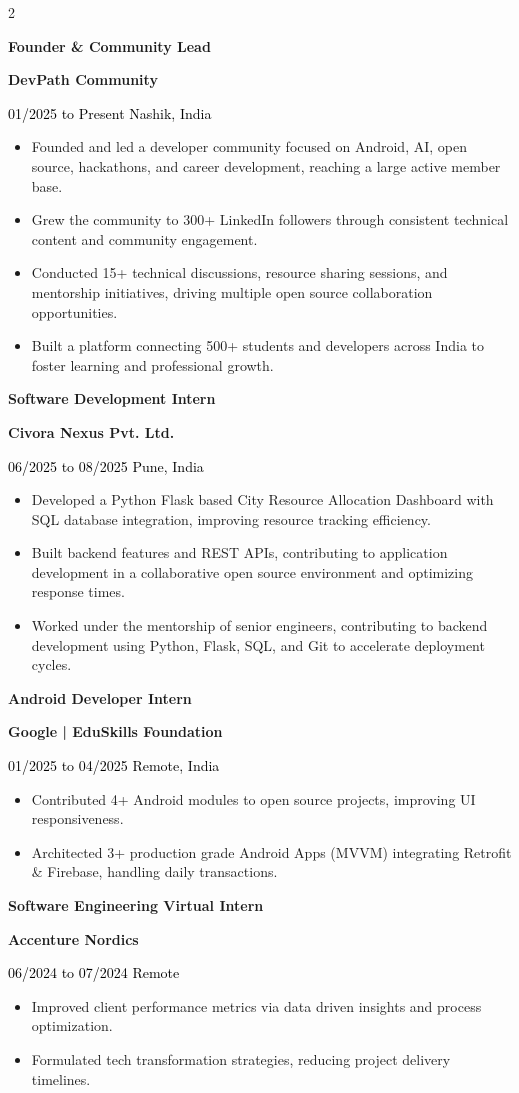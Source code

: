 \documentclass[10pt,a4paper,withhyper]{altacv}
\renewcommand{\cvevent}[4]{%
  \vspace{0.8em}
  {\normalsize\textbf{#1}} \par
  \ifstrequal{#2}{}{}{{\normalsize\rmfamily\textcolor{MyBlue}{\textbf{#2}}} \par}
  \vspace{0.25em}
  \ifstrequal{#3}{}{}{%
    \ifstrequal{#4}{}{%
      {\small\textcolor{Black}{\faCalendar* \hspace{0.2em} #3}}\par
    }{%
      {\small\textcolor{Black}{\faCalendar* \hspace{0.2em} #3 \hspace{1.5em} \faMapMarker \hspace{0.2em} #4}}\par
    }
  }
  \vspace{0.25em}
}
\begin{document}
\begin{paracol}{2}
\switchcolumn

\cvevent{Founder \& Community Lead}{DevPath Community}{01/2025 to Present}{Nashik, India}
\begin{itemize}
  \item Founded and led a developer community focused on Android, AI, open source, hackathons, and career development, reaching a large active member base.
  \item Grew the community to 300+ LinkedIn followers through consistent technical content and community engagement.
  \item Conducted 15+ technical discussions, resource sharing sessions, and mentorship initiatives, driving multiple open source collaboration opportunities.
  \item Built a platform connecting 500+ students and developers across India to foster learning and professional growth.
\end{itemize}

\cvevent{Software Development Intern}{Civora Nexus Pvt. Ltd.}{06/2025 to 08/2025}{Pune, India}
\begin{itemize}
  \item Developed a Python Flask based City Resource Allocation Dashboard with SQL database integration, improving resource tracking efficiency.
  \item Built backend features and REST APIs, contributing to application development in a collaborative open source environment and optimizing response times.
  \item Worked under the mentorship of senior engineers, contributing to backend development using Python, Flask, SQL, and Git to accelerate deployment cycles.
\end{itemize}

\cvevent{Android Developer Intern}{Google | EduSkills Foundation}{01/2025 to 04/2025}{Remote, India}
\begin{itemize}
  \item Contributed 4+ Android modules to open source projects, improving UI responsiveness.
  \item Architected 3+ production grade Android Apps (MVVM) integrating Retrofit \& Firebase, handling daily transactions.
\end{itemize}

\cvevent{Software Engineering Virtual Intern}{Accenture Nordics}{06/2024 to 07/2024}{Remote}
\begin{itemize}
  \item Improved client performance metrics via data driven insights and process optimization.
  \item Formulated tech transformation strategies, reducing project delivery timelines.
\end{itemize}


\end{paracol}
\end{document}
